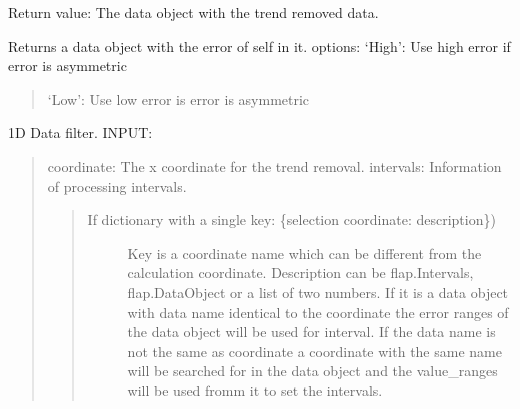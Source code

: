\documentclass[letterpaper,10pt,english]{sphinxmanual}
\begin{document}
\begin{fulllineitems}
\begin{fulllineitems}
\begin{quote}
\begin{description}
\end{description}
\end{quote}

Return value: The data object with the trend removed data.

\end{fulllineitems}


\begin{fulllineitems}
\label{\detokenize{data_object:flap.data_object.DataObject.error_value}}
Returns a data object with the error of self in it.
options: ‘High’: Use high error if error is asymmetric
\begin{quote}

‘Low’: Use low error is error is asymmetric
\end{quote}

\end{fulllineitems}


\begin{fulllineitems}
\label{\detokenize{data_object:flap.data_object.DataObject.filter_data}}
1D Data filter.
INPUT:
\begin{quote}

coordinate: The x coordinate for the trend removal.
intervals: Information of processing intervals.
\begin{quote}
\begin{description}
\item[{If dictionary with a single key: \{selection coordinate: description\})}] \leavevmode
Key is a coordinate name which can be different from the calculation
coordinate.
Description can be flap.Intervals, flap.DataObject or
a list of two numbers. If it is a data object with data name identical to
the coordinate the error ranges of the data object will be used for
interval. If the data name is not the same as coordinate a coordinate with the
same name will be searched for in the data object and the value\_ranges
will be used fromm it to set the intervals.


\end{description}
\end{quote}
\end{quote}
\end{fulllineitems}
\end{fulllineitems}
\end{document}
